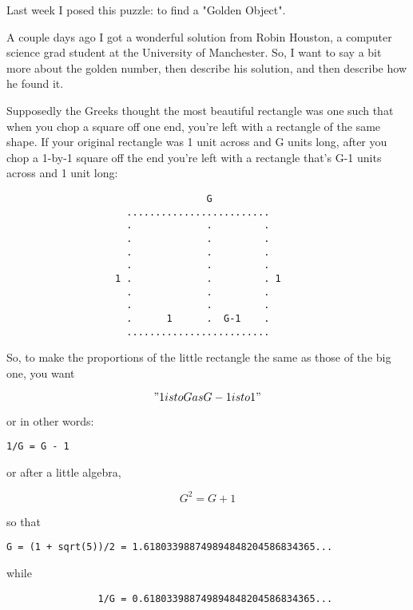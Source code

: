 


Last week I posed this puzzle: to find a "Golden Object".

A couple days ago I got a wonderful solution from Robin Houston, a computer 
science grad student at the University of Manchester.  So, I want to say a 
bit more about the golden number, then describe his solution, and then 
describe how he found it.

Supposedly the Greeks thought the most beautiful rectangle was one such 
that when you chop a square off one end, you're left with a rectangle 
of the same shape.  If your original rectangle was 1 unit across and G 
units long, after you chop a 1-by-1 square off the end you're left with 
a rectangle that's G-1 units across and 1 unit long:
                           
\begin{verbatim}
                                   G
                     .........................
                     .             .         .
                     .             .         .
                     .             .         .
                     .             .         .
                   1 .             .         . 1
                     .             .         .
                     .             .         .
                     .      1      .  G-1    .
                     .........................
\end{verbatim}
    
So, to make the proportions of the little rectangle the same as those of
the big one, you want

$$
"1 is to G as G-1 is to 1"
$$
    
or in other words:

\begin{verbatim}
1/G = G - 1 
\end{verbatim}
    
or after a little algebra,

$$
G^{2} = G + 1
$$
    
so that

\begin{verbatim}
G = (1 + sqrt(5))/2 = 1.618033988749894848204586834365...
\end{verbatim}
    
while 

\begin{verbatim}
                1/G = 0.618033988749894848204586834365...
\end{verbatim}
    
